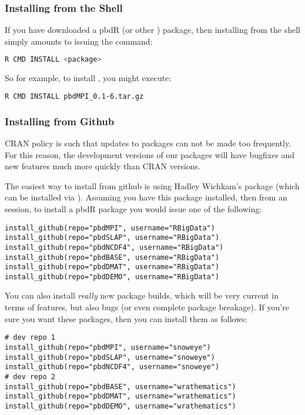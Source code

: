 \subsubsection{Installing from the Shell}
If you have downloaded a pbdR (or other ) package, then installing from the shell simply amounts to issuing the command:
\begin{lstlisting}[language=sh]
R CMD INSTALL <package>
\end{lstlisting}
So for example, to install , you might execute:
\begin{lstlisting}[language=sh]
R CMD INSTALL pbdMPI_0.1-6.tar.gz
\end{lstlisting}


\subsubsection{Installing from Github}
CRAN policy is such that updates to packages can not be made too frequently.  For this reason, the development versions of our packages will have bugfixes and new features much more quickly than CRAN versions.  

The easiest way to install from github is using Hadley Wichkam's  package (which can be installed via ).  Assuming you have this package installed, then from an  session, to install a pbdR package you would issue one of the following:

\begin{lstlisting}[language=rr]
install_github(repo="pbdMPI", username="RBigData")
install_github(repo="pbdSLAP", username="RBigData")
install_github(repo="pbdNCDF4", username="RBigData")
install_github(repo="pbdBASE", username="RBigData")
install_github(repo="pbdDMAT", username="RBigData")
install_github(repo="pbdDEMO", username="RBigData")
\end{lstlisting}

You can also install \emph{really} new package builds, which will be very current in terms of features, but also bugs (or even complete package breakage).  If you're sure you want these packages, then you can install them as follows:

\begin{lstlisting}[language=rr]
# dev repo 1
install_github(repo="pbdMPI", username="snoweye")
install_github(repo="pbdSLAP", username="snoweye")
install_github(repo="pbdNCDF4", username="snoweye")
# dev repo 2
install_github(repo="pbdBASE", username="wrathematics")
install_github(repo="pbdDMAT", username="wrathematics")
install_github(repo="pbdDEMO", username="wrathematics")
\end{lstlisting}
